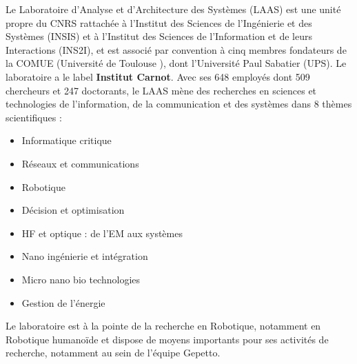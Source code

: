\documentclass{report}
\begin{document}
Le Laboratoire d’Analyse et d’Architecture des Systèmes (LAAS) est une unité propre du CNRS rattachée à l’Institut des Sciences de l'Ingénierie et des Systèmes (INSIS) et à l'Institut des Sciences de l'Information et de leurs Interactions (INS2I), et est associé par convention à cinq membres fondateurs de la COMUE (\og Université de Toulouse \fg{}), dont l'Université Paul Sabatier (UPS). Le laboratoire a le label \textbf{Institut Carnot}. Avec ses 648 employés dont 509 chercheurs et 247 doctorants, le LAAS mène des recherches en sciences et technologies de l’information, de la communication et des systèmes dans 8 thèmes scientifiques :

\setlength{\columnsep}{10pt}
\begin{multicols}{2}\raggedcolumns
\begin{itemize}
\item Informatique critique
\item Réseaux et communications
\item Robotique
\item Décision et optimisation
\item HF et optique : de l'EM aux systèmes
\item Nano ingénierie et intégration
\item Micro nano bio technologies
\item Gestion de l'énergie
\end{itemize}
\end{multicols}

\noindent
Le laboratoire est à la pointe de la recherche en Robotique, notamment en Robotique humanoïde et dispose de moyens importants pour ses activités de recherche, notamment au sein de l'équipe Gepetto. 
\end{document}
